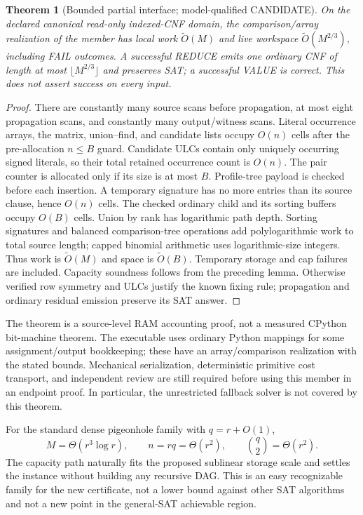 \documentclass[11pt]{article}
\newtheorem{theorem}{Theorem}
\newcommand{\softO}{\widetilde O}
\begin{document}
\begin{theorem}[Bounded partial interface; model-qualified CANDIDATE]
On the declared canonical read-only indexed-CNF domain, the comparison/array
realization of the member has local work $\softO(M)$ and live workspace
$\softO(M^{2/3})$, including FAIL outcomes. A successful REDUCE emits one
ordinary CNF of length at most $\lfloor M^{2/3}\rfloor$ and preserves SAT;
a successful VALUE is correct. This does not assert success on every input.
\end{theorem}
\begin{proof}
There are constantly many source scans before propagation, at most eight
propagation scans, and constantly many output/witness scans. Literal
occurrence arrays, the matrix, union--find, and candidate lists occupy
$O(n)$ cells after the pre-allocation $n\le B$ guard. Candidate ULCs contain
only uniquely occurring signed literals, so their total retained occurrence
count is $O(n)$. The pair counter is allocated only if its size is at most
$B$. Profile-tree payload is checked before each insertion. A temporary
signature has no more entries than its source clause, hence $O(n)$ cells.
The checked ordinary child and its sorting buffers occupy $O(B)$ cells.
Union by rank has logarithmic path depth. Sorting signatures and balanced
comparison-tree operations add polylogarithmic work to total source length;
capped binomial arithmetic uses logarithmic-size integers. Thus work is
$\softO(M)$ and space is $\softO(B)$. Temporary storage and cap failures are
included. Capacity soundness follows from the preceding lemma. Otherwise
verified row symmetry and ULCs justify the known fixing rule; propagation
and ordinary residual emission preserve its SAT answer.
\end{proof}

The theorem is a source-level RAM accounting proof, not a measured CPython
bit-machine theorem. The executable uses ordinary Python mappings for some
assignment/output bookkeeping; these have an array/comparison realization
with the stated bounds. Mechanical serialization, deterministic primitive
cost transport, and independent review are still required before using this
member in an endpoint proof. In particular, the unrestricted fallback solver
is not covered by this theorem.

For the standard dense pigeonhole family with $q=r+O(1)$,
\[
 M=\Theta(r^3\log r),\qquad n=rq=\Theta(r^2),
 \qquad \binom q2=\Theta(r^2).
\]
The capacity path naturally fits the proposed sublinear storage scale and
settles the instance without building any recursive DAG. This is an easy
recognizable family for the new certificate, not a lower bound against other
SAT algorithms and not a new point in the general-SAT achievable region.
\end{document}
